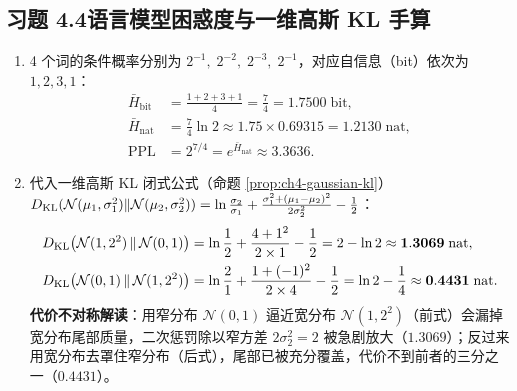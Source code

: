 \subsection*{习题 4.4\quad 语言模型困惑度与一维高斯 KL 手算}
\begin{enumerate}[label=(\arabic*), leftmargin=1.8em]
  \item 4 个词的条件概率分别为 $2^{-1},\; 2^{-2},\; 2^{-3},\; 2^{-1}$，对应自信息（bit）依次为 $1, 2, 3, 1$：
  \begin{align*}
    \bar{H}_{\mathrm{bit}} &= \frac{1 + 2 + 3 + 1}{4} = \frac{7}{4} = \mathbf{1.7500}\;\text{bit}, \\
    \bar{H}_{\mathrm{nat}} &= \frac{7}{4}\ln 2 \approx 1.75 \times 0.69315 = \mathbf{1.2130}\;\text{nat}, \\
    \mathrm{PPL} &= 2^{7/4} = e^{\bar{H}_{\mathrm{nat}}} \approx \mathbf{3.3636}.
  \end{align*}
  \item 代入一维高斯 KL 闭式公式（命题 \ref{prop:ch4-gaussian-kl}）$D_{\mathrm{KL}}(\mathcal{N}(\mu_1,\sigma_1^2)\|\mathcal{N}(\mu_2,\sigma_2^2)) = \ln\frac{\sigma_2}{\sigma_1} + \frac{\sigma_1^2 + (\mu_1-\mu_2)^2}{2\sigma_2^2} - \frac{1}{2}$：
  \begin{align*}
    D_{\mathrm{KL}}\bigl(\mathcal{N}(1, 2^2) \,\|\, \mathcal{N}(0, 1)\bigr)
    &= \ln\frac{1}{2} + \frac{4 + 1^2}{2\times 1} - \frac{1}{2}
     = 2 - \ln 2 \approx \mathbf{1.3069}\;\text{nat}, \\
    D_{\mathrm{KL}}\bigl(\mathcal{N}(0, 1) \,\|\, \mathcal{N}(1, 2^2)\bigr)
    &= \ln\frac{2}{1} + \frac{1 + (-1)^2}{2\times 4} - \frac{1}{2}
     = \ln 2 - \frac{1}{4} \approx \mathbf{0.4431}\;\text{nat}.
  \end{align*}
  \textbf{代价不对称解读}：用窄分布 $\mathcal{N}(0,1)$ 逼近宽分布 $\mathcal{N}(1, 2^2)$（前式）会漏掉宽分布尾部质量，二次惩罚除以窄方差 $2\sigma_2^2=2$ 被急剧放大（$1.3069$）；反过来用宽分布去罩住窄分布（后式），尾部已被充分覆盖，代价不到前者的三分之一（$0.4431$）。
\end{enumerate}

